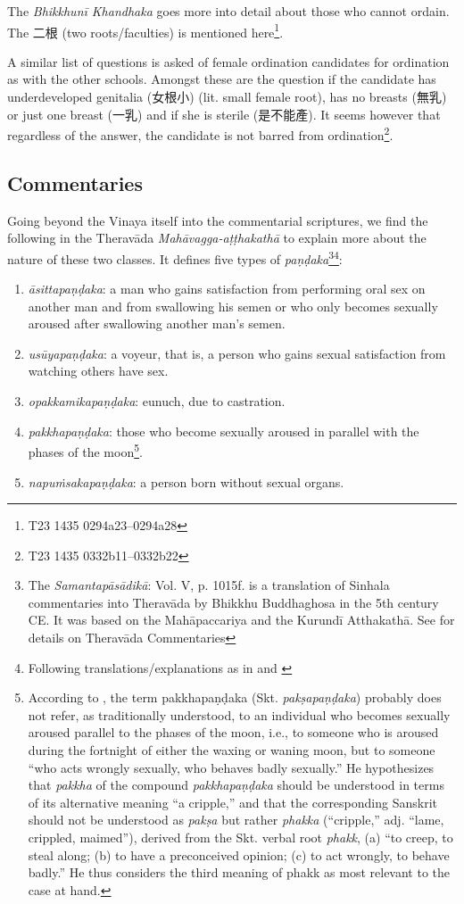 The {\em Bhikkhunī Khandhaka} goes more into detail about those who cannot ordain. The 二根 (two roots/faculties) is mentioned here\footnote{T23 1435 0294a23–0294a28}. 

A similar list of questions is asked of female ordination candidates for ordination as with the other schools. Amongst these are the question if the candidate has underdeveloped genitalia (女根小) (lit. small female root), has no breasts (無乳) or just one breast (一乳) and if she is sterile (是不能產). It seems however that regardless of the answer, the candidate is not barred from ordination\footnote{T23 1435 0332b11–0332b22}.


\subsection{Commentaries}

Going beyond the Vinaya itself into the commentarial scriptures, we find the following in the Theravāda {\em Mahāvagga-aṭṭhakathā} to explain more about the nature of these two classes. It defines five types of {\em paṇḍaka}\footnote{The {\em Samantapāsādikā}: Vol. V, p. 1015f. is a translation of Sinhala commentaries into Theravāda by Bhikkhu Buddhaghosa in the 5th century CE. It was based on the Mahāpaccariya and the Kurundī Atthakathā. See \cite{goonesekere} for details on Theravāda Commentaries}\footnote{Following translations/explanations as in \cite{bomhard} and \cite{thanissaro}}:

\begin{enumerate}
\item {\em āsittapaṇḍaka}: a man who gains satisfaction from performing oral sex on another man and from swallowing his semen or who only becomes sexually aroused after swallowing another man’s semen. 
\item {\em usūyapaṇḍaka}: a voyeur, that is, a person who gains sexual satisfaction from watching others have sex. 
\item {\em opakkamikapaṇḍaka}: eunuch, due to castration.
\item {\em pakkhapaṇḍaka}: those who become sexually aroused in parallel with the phases of the moon\footnote{According to \cite{bomhard}, the term pakkhapaṇḍaka (Skt. {\em pakṣapaṇḍaka}) probably does not refer, as traditionally understood, to an individual who becomes sexually aroused parallel to the phases of the moon, i.e., to someone who is aroused during the fortnight of either the waxing or waning moon, but to someone “who acts wrongly sexually, who behaves badly sexually.” He hypothesizes that {\em pakkha} of the compound {\em pakkhapaṇḍaka} should be understood in terms of its alternative meaning “a cripple,” and that the corresponding Sanskrit should not be understood as {\em pakṣa} but rather {\em phakka} (“cripple,” adj. “lame, crippled, maimed”), derived from the Skt. verbal root {\em phakk}, (a) “to creep, to steal along; (b) to have a preconceived opinion; (c) to act wrongly, to behave badly.” He thus considers the third meaning of phakk as most relevant to the case at hand.}.
\item {\em napuṁsakapaṇḍaka}: a person born without sexual organs. 
\end{enumerate}

